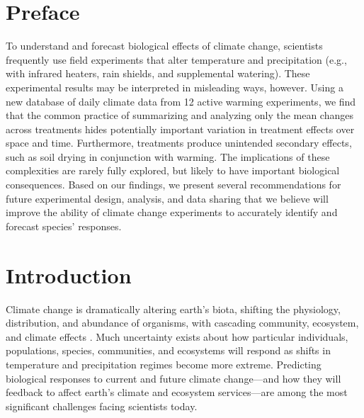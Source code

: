 \documentclass{article}
\begin{document}
\section* {Preface} 
\par To understand and forecast biological effects of climate change, scientists frequently use field experiments that alter temperature and precipitation (e.g., with infrared heaters, rain shields, and supplemental watering). These experimental results may be interpreted in misleading ways, however. Using a new database of daily climate data from 12 active warming experiments, we find that the common practice of summarizing and analyzing only the mean changes across treatments hides potentially important variation in treatment effects over space and time. Furthermore, treatments produce unintended secondary effects, such as soil drying in conjunction with warming. The implications of these complexities are rarely fully explored, but likely to have important biological consequences. Based on our findings, we present several recommendations for future experimental design, analysis, and data sharing that we believe will improve the ability of climate change experiments to accurately identify and forecast species' responses.
\section* {Introduction}
\par Climate change is dramatically altering earth's biota, shifting the physiology, distribution, and abundance of organisms, with cascading community, ecosystem, and climate effects \citep{shukla1982,cox2000,thomas2004,parmesan2006,field2007,sheldon2011,urban2012}. Much uncertainty exists about how particular individuals, populations, species, communities, and ecosystems will respond as shifts in temperature and precipitation regimes become more extreme. Predicting biological responses to current and future climate change---and how they will feedback to affect earth's climate and ecosystem services---are among the most significant challenges facing scientists today.
\end{document}
